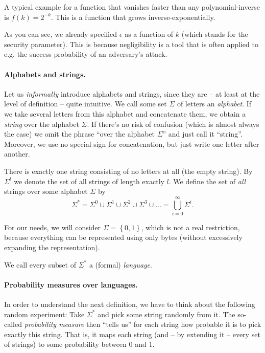 A typical example for a function that vanishes faster than any polynomial-inverse is $f(k)=2^{-k}$. This is a function that grows inverse-exponentially.

As you can see, we already specified $\epsilon$ as a function of $k$ (which stands for the security parameter). This is because negligibility is a tool that is often applied to e.g. the success probability of an adversary's attack.

\paragraph{Alphabets and strings.}

Let us \emph{informally} introduce alphabets and strings, since they are -- at least at the level of definition -- quite intuitive. We call some set $\Sigma$ of letters an \emph{alphabet}. If we take several letters from this alphabet and concatenate them, we obtain a \emph{string} over the alphabet $\Sigma$. If there's no risk of confusion (which is almost always the case) we omit the phrase ``over the alphabet $\Sigma$'' and just call it ``string''. Moreover, we use no special sign for concatenation, but just write one letter after another.

There is exactly one string consisting of no letters at all (the empty string). By $\Sigma^l$ we denote the set of all strings of length exactly $l$. We define the set of \emph{all} strings over some alphabet $\Sigma$ by
\begin{equation*}
\Sigma^*=\Sigma^0\cup\Sigma^1\cup\Sigma^2\cup\Sigma^3\cup\dots=\bigcup_{i=0}^\infty\Sigma^i.
\end{equation*}

For our needs, we will consider $\Sigma=\left\{ 0,1 \right\}$, which is not a real restriction, because everything can be represented using only bytes (without excessively expanding the
representation).

We call every subset of $\Sigma^*$ a (formal) \emph{language}.

\paragraph{Probability measures over languages.}

In order to understand the next definition, we have to think about the following random experiment: Take $\Sigma^*$ and pick some string randomly from it. The so-called \emph{probability measure} then ``tells us'' for each string how probable it is to pick exactly this string. That is, it maps each string (and -- by extending it -- every set of strings) to some probability between 0 and 1.

